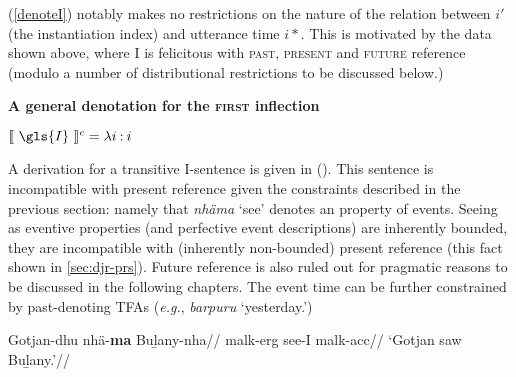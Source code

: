(\ref{denoteI}) notably makes no restrictions on the nature of the relation between $ i' $ (the instantiation index) and utterance time $ i* $. This is motivated by the data shown above, where \gls{I} is felicitous with \textsc{past, present} and \textsc{future} reference (modulo a number of distributional restrictions to be discussed below.)

\pex\textbf{A general denotation for the \textsc{first} inflection}
\label{denoteI}

$ \denote[c]{~\gls{I}~}=\lambda i\mathbin:i $
\xe



A derivation for a transitive \gls{I}-sentence is given in (\nextx). This sentence is incompatible with present reference given the constraints described in the previous section: namely that \textit{nhäma} `see' denotes an property of events. Seeing as eventive properties (and perfective event descriptions) are inherently bounded, they are incompatible with (inherently non-bounded) present reference (this fact shown in  \ref{sec:djr-prs}). Future reference is also ruled out for pragmatic reasons to be discussed in the following chapters.
The event time can be further constrained by past-denoting TFAs (\textit{e.g.}, \textit{barpuru} `yesterday.')

\pex\begingl\gla Gotjan-dhu nhä-\textbf{ma} Buḻany-nha//
\glb \gls{malk}-\gls{erg} see-\gls{I} \gls{malk}-\gls{acc}//
\glft`Gotjan saw Buḻany.'//\endgl

\xe

